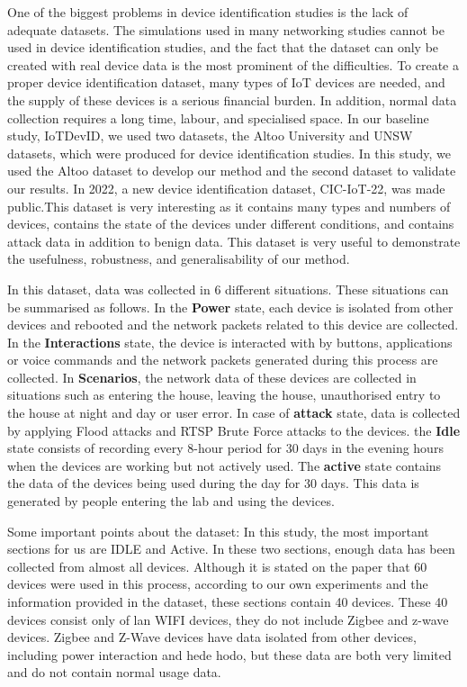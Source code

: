 \documentclass[journal]{IEEEtran}
\begin{document}
One of the biggest problems in device identification studies is the lack of adequate datasets. The simulations used in many networking studies cannot be used in device identification studies, and the fact that the dataset can only be created with real device data is the most prominent of the difficulties. To create a proper device identification dataset, many types of IoT devices are needed, and the supply of these devices is a serious financial burden. In addition, normal data collection requires a long time, labour, and specialised space. In our baseline study, IoTDevID, we used two datasets, the Altoo University and UNSW datasets, which were produced for device identification studies. In this study, we used the Altoo dataset to develop our method and the second dataset to validate our results. In 2022, a new device identification dataset, CIC-IoT-22, was made public.This dataset is very interesting as it contains many types and numbers of devices, contains the state of the devices under different conditions, and contains attack data in addition to benign data.  This dataset is very useful to demonstrate the usefulness, robustness, and generalisability of our method. 




In this dataset, data was collected in 6 different situations. These situations can be summarised as follows. 
In the \textbf{Power} state, each device is isolated from other devices and rebooted and the network packets related to this device are collected.
In the \textbf{Interactions} state, the device is interacted with by buttons, applications or voice commands and the network packets generated during this process are collected.
In \textbf{Scenarios}, the network data of these devices are collected in situations such as entering the house, leaving the house, unauthorised entry to the house at night and day or user error. 
In case of \textbf{attack} state, data is collected by applying Flood attacks and RTSP Brute Force attacks to the devices.
the \textbf{Idle} state consists of recording every 8-hour period for 30 days in the evening hours when the devices are working but not actively used.
The \textbf{active} state contains the data of the devices being used during the day for 30 days. This data is generated by people entering the lab and using the devices.

Some important points about the dataset:
In this study, the most important sections for us are IDLE and Active. In these two sections, enough data has been collected from almost all devices. Although it is stated on the paper that 60 devices were used in this process, according to our own experiments and the information provided in the dataset, these sections contain 40 devices. These 40 devices consist only of lan WIFI devices, they do not include Zigbee and z-wave devices. Zigbee and Z-Wave devices have data isolated from other devices, including power interaction and hede hodo, but these data are both very limited and do not contain normal usage data.
\end{document}
